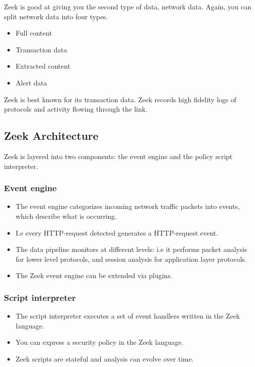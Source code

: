 \documentclass{article}
\begin{document}
Zeek is good at giving you the second type of data, network data. Again, you can split network data into four types.
\begin{itemize}
    \item Full content
    \item Transaction data
    \item Extracted content
    \item Alert data
\end{itemize}
Zeek is best known for its transaction data. Zeek records high fidelity logs of protocols and activity flowing through the link.
\subsection{Zeek Architecture}
Zeek is layered into two components: the event engine and the policy script interpreter.

\subsubsection{Event engine}
\begin{itemize}
    \item The event engine categorizes incoming network traffic packets into events, which describe what is occurring.
    \item I.e every HTTP-request detected generates a HTTP-request event.
    \item The data pipeline monitors at different levels: i.e it performs packet analysis for lower level protocols, and session analysis for application layer protocols.
    \item The Zeek event engine can be extended via plugins.
\end{itemize}

\subsubsection{Script interpreter}
\begin{itemize}
    \item The script interpreter executes a set of event handlers written in the Zeek language.
    \item You can express a security policy in the Zeek language.
    \item Zeek scripts are stateful and analysis can evolve over time.
\end{itemize}
\end{document}
